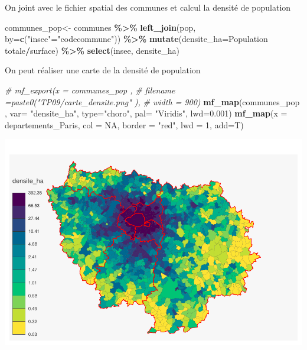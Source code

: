 \documentclass[
]{book}
\newenvironment{Shaded}{\begin{snugshade}}{\end{snugshade}}
\newcommand{\AttributeTok}[1]{\textcolor[rgb]{0.13,0.29,0.53}{#1}}
\newcommand{\CommentTok}[1]{\textcolor[rgb]{0.56,0.35,0.01}{\textit{#1}}}
\newcommand{\ConstantTok}[1]{\textcolor[rgb]{0.56,0.35,0.01}{#1}}
\newcommand{\DecValTok}[1]{\textcolor[rgb]{0.00,0.00,0.81}{#1}}
\newcommand{\FloatTok}[1]{\textcolor[rgb]{0.00,0.00,0.81}{#1}}
\newcommand{\FunctionTok}[1]{\textcolor[rgb]{0.13,0.29,0.53}{\textbf{#1}}}
\newcommand{\NormalTok}[1]{#1}
\newcommand{\OtherTok}[1]{\textcolor[rgb]{0.56,0.35,0.01}{#1}}
\newcommand{\SpecialCharTok}[1]{\textcolor[rgb]{0.81,0.36,0.00}{\textbf{#1}}}
\newcommand{\StringTok}[1]{\textcolor[rgb]{0.31,0.60,0.02}{#1}}
\begin{document}
On joint avec le fichier spatial des communes et calcul la densité de population

\begin{Shaded}
\begin{Highlighting}[]
\NormalTok{communes\_pop}\OtherTok{\textless{}{-}}\NormalTok{ communes }\SpecialCharTok{\%\textgreater{}\%}
  \FunctionTok{left\_join}\NormalTok{(pop, }\AttributeTok{by=}\FunctionTok{c}\NormalTok{(}\StringTok{"insee"}\OtherTok{=}\StringTok{"codecommune"}\NormalTok{)) }\SpecialCharTok{\%\textgreater{}\%}
  \FunctionTok{mutate}\NormalTok{(}\AttributeTok{densite\_ha=}\StringTok{\textasciigrave{}}\AttributeTok{Population totale}\StringTok{\textasciigrave{}}\SpecialCharTok{/}\NormalTok{surface) }\SpecialCharTok{\%\textgreater{}\%}
  \FunctionTok{select}\NormalTok{(insee, densite\_ha)}
\end{Highlighting}
\end{Shaded}

On peut réaliser une carte de la densité de population

\begin{Shaded}
\begin{Highlighting}[]
\CommentTok{\# mf\_export(x = communes\_pop ,}
\CommentTok{\#           filename =paste0("TP09/carte\_densite.png" ),}
\CommentTok{\#           width = 900)}
\FunctionTok{mf\_map}\NormalTok{(communes\_pop ,}
       \AttributeTok{var=} \StringTok{"densite\_ha"}\NormalTok{,}
       \AttributeTok{type=}\StringTok{"choro"}\NormalTok{,}
       \AttributeTok{pal=} \StringTok{"Viridis"}\NormalTok{,}
       \AttributeTok{lwd=}\FloatTok{0.001}\NormalTok{)}
\FunctionTok{mf\_map}\NormalTok{(}\AttributeTok{x =}\NormalTok{ departements\_Paris, }\AttributeTok{col =} \ConstantTok{NA}\NormalTok{, }\AttributeTok{border =} \StringTok{"red"}\NormalTok{, }\AttributeTok{lwd =} \DecValTok{1}\NormalTok{, }\AttributeTok{add=}\NormalTok{T)}
\end{Highlighting}
\end{Shaded}

\includegraphics{manuel_geo_quanti_files/figure-latex/unnamed-chunk-78-1.pdf}
\end{document}

